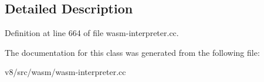 \subsection{Detailed Description}


Definition at line 664 of file wasm-\/interpreter.\+cc.



The documentation for this class was generated from the following file\+:\begin{DoxyCompactItemize}
\item 
v8/src/wasm/wasm-\/interpreter.\+cc\end{DoxyCompactItemize}
